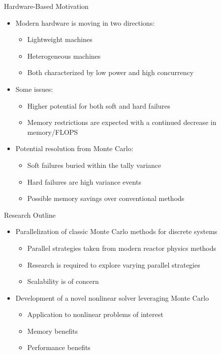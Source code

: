 \documentclass{beamer}
\begin{document}
\begin{frame}{Hardware-Based Motivation}

  \begin{itemize}
  \item Modern hardware is moving in two directions:
    \begin{itemize}
    \item Lightweight machines
    \item Heterogeneous machines
    \item Both characterized by low power and high concurrency
    \end{itemize}
  \item Some issues:
    \begin{itemize}
    \item Higher potential for both soft and hard failures
    \item Memory restrictions are expected with a continued decrease
      in memory/FLOPS
    \end{itemize}
  \item Potential resolution from Monte Carlo:
    \begin{itemize}
    \item Soft failures buried within the tally variance
    \item Hard failures are high variance events
    \item Possible memory savings over conventional methods
    \end{itemize}
  \end{itemize}

\end{frame}

\begin{frame}{Research Outline}
  \begin{itemize}
    \item Parallelization of classic Monte Carlo methods for discrete
      systems
      \begin{itemize}
      \item Parallel strategies taken from modern reactor physics
        methods
      \item Research is required to explore varying parallel
        strategies
      \item Scalability is of concern
      \end{itemize}
    \item Development of a novel nonlinear solver leveraging Monte Carlo
      \begin{itemize}
        \item Application to nonlinear problems of interest
        \item Memory benefits
        \item Performance benefits
      \end{itemize}
  \end{itemize}
\end{frame}
\end{document}
